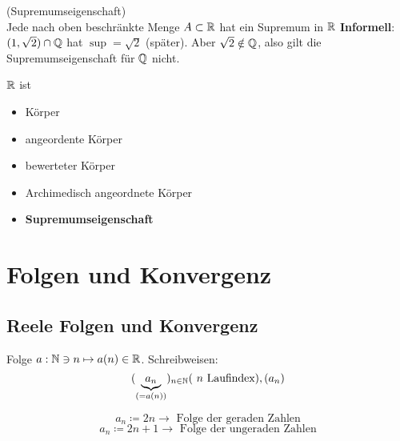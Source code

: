 \documentclass[consecutivenumbering]{gadsescript}
\begin{document}
 (Supremumseigenschaft)\\
Jede nach oben beschränkte Menge $ A \subset \mathbb{R} $ hat ein Supremum in $ \mathbb{R} $
\textbf{Informell}: $ ( 1, \sqrt{2} ) \cap \mathbb{Q} $ hat $\sup = \sqrt{2} $ (später). Aber $ \sqrt{2} \notin \mathbb{Q} $, also gilt die Supremumseigenschaft für $ \mathbb{Q} $ nicht.\par

$ \mathbb{R} $ ist
\begin{itemize}
	\item Körper
	\item angeordente Körper
	\item bewerteter Körper
	\item Archimedisch angeordnete Körper
	\item \textbf{Supremumseigenschaft}
\end{itemize}

\section{Folgen und Konvergenz}
\subsection{Reele Folgen und Konvergenz}
Folge $ a: \mathbb{N} \ni n \mapsto a ( n ) \in \mathbb{R} $. Schreibweisen:
\[ ( \underbrace{a_n}_{( = a(n))} )_{n \in \mathbb{N}} \text{( $ n $ Laufindex)}, (a_n) \]
\begin{subexample}
	\[ a_n \coloneqq 2  n \to \text{ Folge der geraden Zahlen} \]
	\[ a_n \coloneqq 2n+1 \to \text{ Folge der ungeraden Zahlen} \]
\end{subexample}
\end{document}
